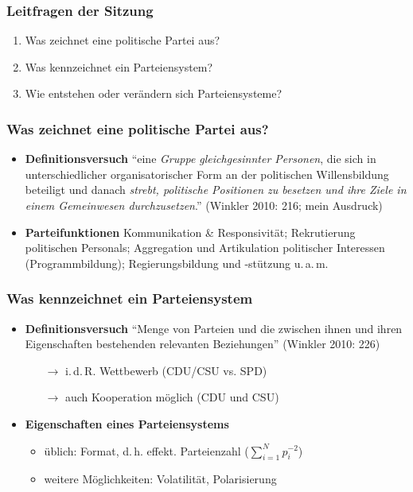 \documentclass{beamer}
\begin{document}
\maketitle

\begin{frame}
    \frametitle{Leitfragen der Sitzung}
    \begin{enumerate}
        \item Was zeichnet eine politische Partei aus?
        \item Was kennzeichnet ein Parteiensystem?
        \item Wie entstehen oder verändern sich Parteiensysteme?
    \end{enumerate}
\end{frame}

\begin{frame}
    \frametitle{Was zeichnet eine politische Partei aus?}
    \begin{itemize}
        \item \textbf{Definitionsversuch}\newline
        ``eine \textit{Gruppe gleichgesinnter Personen}, die sich in
        unterschiedlicher organisatorischer Form an der politischen
        Willensbildung beteiligt und danach \textit{strebt,
        politische Positionen zu besetzen und ihre Ziele in einem
        Gemeinwesen durchzusetzen}.'' (Winkler 2010: 216; mein
        Ausdruck)
    \item \textbf{Parteifunktionen}\newline
        Kommunikation \& Responsivität; Rekrutierung
        politischen Personals; Aggregation und Artikulation
        politischer Interessen (Programmbildung); Regierungsbildung
        und -stützung u.\,a.\,m.
    \end{itemize}
\end{frame}

\begin{frame}
    \frametitle{Was kennzeichnet ein Parteiensystem}
    \begin{itemize}
        \item \textbf{Definitionsversuch}\newline
        ``Menge von Parteien und die zwischen ihnen und ihren Eigenschaften bestehenden relevanten Beziehungen'' (Winkler 2010: 226)
        \begin{itemize}
            \item [$\rightarrow$] i.\,d.\,R. Wettbewerb (CDU/CSU vs. SPD)
            \item [$\rightarrow$] auch Kooperation möglich (CDU und CSU)
        \end{itemize}
        \item \textbf{Eigenschaften eines Parteiensystems}
        \begin{itemize}
            \item üblich: Format, d.\,h. effekt. Parteienzahl ($\sum_{i=1}^N p_i^{-2}$)
            \item weitere Möglichkeiten: Volatilität, Polarisierung
        \end{itemize}
    \end{itemize}
\end{frame}
\end{document}
